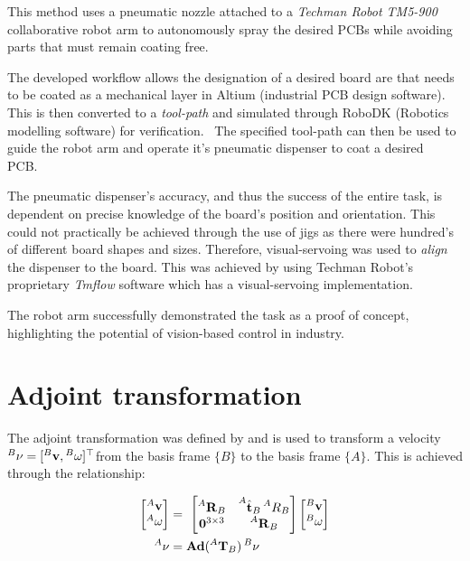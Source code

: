 \documentclass{UoNMCHA}
\numberwithin{equation}{section}
\begin{document}
This method uses a pneumatic nozzle attached to a \textit{Techman Robot TM5-900} collaborative robot arm to autonomously spray the desired PCBs while avoiding parts that must remain coating free. \


The developed workflow allows the designation of a desired board are that needs to be coated as a mechanical layer in Altium (industrial PCB design software). This is then converted to a \textit{tool-path} and simulated through RoboDK (Robotics modelling software) for verification. \
The specified tool-path can then be used to guide the robot arm and operate it's pneumatic dispenser to coat a desired PCB.\


The pneumatic dispenser's accuracy, and thus the success of the entire task, is dependent on precise knowledge of the board's position and orientation. This could not practically be achieved through the use of jigs as there were hundred's of different board shapes and sizes. Therefore, visual-servoing was used to \textit{align} the dispenser to the board. This was achieved by using Techman Robot's proprietary \textit{Tmflow} software which has a visual-servoing implementation.\

The robot arm successfully demonstrated the task as a proof of concept, highlighting the potential of vision-based control in industry.

\section{Adjoint transformation}\label{Adjoint transformation}

The adjoint transformation was defined by \cite{Banavar2008} and is used to transform a velocity $\prescript{B}{}{\mathbf{\nu}} = [\prescript{B}{}{\mathbf{v}} , \prescript{B}{}{\mathbf{\omega}}]^{\top}$from the basis frame $\{B\}$ to the basis frame $\{A\}$. This is achieved through the relationship:

\begin{equation}
	\begin{split}
		\begin{bmatrix}
			\prescript{A}{}{\mathbf{v}} \\ \prescript{A}{}{\mathbf{\omega}}
		\end{bmatrix}
		& = \
		\begin{bmatrix}
			\prescript{A}{}{\mathbf{R}}_B & \prescript{A}{}{\hat{\mathbf{t}}}_B \prescript{A}{}{R}_B \\
			\mathbf{0}^{3 \times 3}	& \prescript{A}{}{\mathbf{R}}_B
		\end{bmatrix} 
		\begin{bmatrix}
			\prescript{B}{}{\mathbf{v}} \\ \prescript{B}{}{\mathbf{\omega}}
		\end{bmatrix} \\
		\prescript{A}{}{\mathbf{\nu}} & = \mathbf{Ad}(\prescript{A}{}{\mathbf{T}}_B) \prescript{B}{}{\mathbf{\nu}}
		\end{split}
\end{equation}
\end{document}
